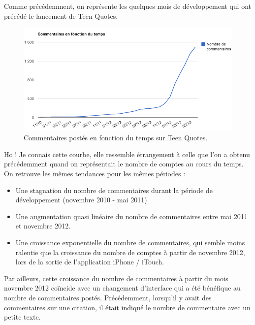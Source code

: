\documentclass{report}
\begin{document}
	Comme précédemment, on représente les quelques mois de développement qui ont précédé le lancement de Teen Quotes.
	\begin{figure}[H]
		\center
		\includegraphics[width=450px]{images/commentairesTemps.png}
		\caption{Commentaires postés en fonction du temps sur Teen Quotes.}
	\end{figure}
	Ho ! Je connais cette courbe, elle ressemble étrangement à celle que l'on a obtenu précédemment quand on représentait le nombre de comptes au cours du temps. On retrouve les mêmes tendances pour les mêmes périodes :
	\vspace{10px}
	\begin{itemize}
		\item Une stagnation du nombre de commentaires durant la période de développement (novembre 2010 - mai 2011)
		\item Une augmentation quasi linéaire du nombre de commentaires entre mai 2011 et novembre 2012.
		\item Une croissance exponentielle du nombre de commentaires, qui semble moins ralentie que la croissance du nombre de comptes à partir de novembre 2012, lors de la sortie de l'application iPhone / iTouch.
	\end{itemize}
	\vspace{10px}
	Par ailleurs, cette croissance du nombre de commentaires à partir du mois novembre 2012 coïncide avec un changement d'interface qui a été bénéfique au nombre de commentaires postés. Précédemment, lorsqu'il y avait des commentaires sur une citation, il était indiqué le nombre de commentaire avec un petite texte.\\
\end{document}
